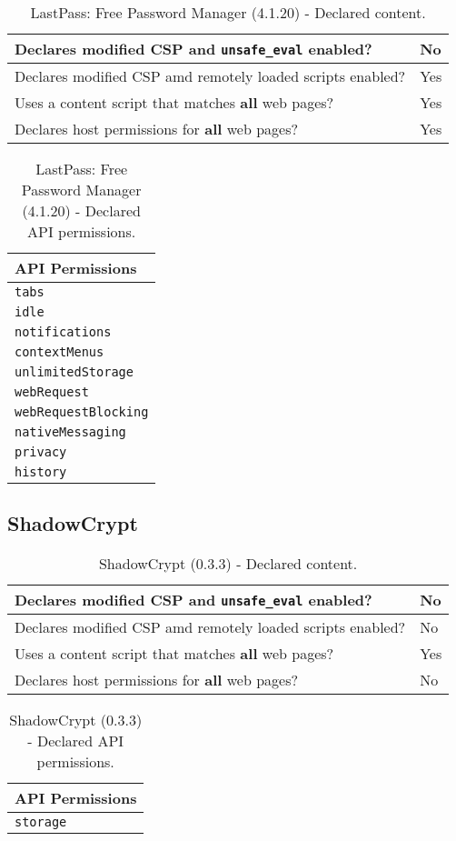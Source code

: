 \begin{table}[h]
	\centering
	\begin{tabular}{|l|l|} \hline
		Declares modified CSP and \texttt{unsafe\_eval} enabled? & No \\ \hline
		Declares modified CSP amd remotely loaded scripts enabled? & Yes \\ \hline
		Uses a content script that matches \textbf{all} web pages? & Yes \\ \hline
		Declares host permissions for \textbf{all} web pages? & Yes \\ \hline
	\end{tabular}
	\caption{LastPass: Free Password Manager (4.1.20) - Declared content.}
\end{table}
\begin{table}[h]
	\centering
	\begin{tabular}{|l|} \hline
		\textbf{API Permissions} \\ \hline
		\texttt{tabs} \\
		\texttt{idle} \\
		\texttt{notifications} \\
		\texttt{contextMenus} \\
		\texttt{unlimitedStorage} \\
		\texttt{webRequest} \\
		\texttt{webRequestBlocking} \\
		\texttt{nativeMessaging} \\
		\texttt{privacy} \\
		\texttt{history} \\
		\hline
	\end{tabular}
	\caption{LastPass: Free Password Manager (4.1.20) - Declared API permissions.}
\end{table}
\newpage
\subsection{ShadowCrypt}

\begin{table}[h]
	\centering
	\begin{tabular}{|l|l|} \hline
		Declares modified CSP and \texttt{unsafe\_eval} enabled? & No \\ \hline
		Declares modified CSP amd remotely loaded scripts enabled? & No \\ \hline
		Uses a content script that matches \textbf{all} web pages? & Yes \\ \hline
		Declares host permissions for \textbf{all} web pages? & No \\ \hline
	\end{tabular}
	\caption{ShadowCrypt (0.3.3) - Declared content.}
\end{table}
\begin{table}[h]
	\centering
	\begin{tabular}{|l|} \hline
		\textbf{API Permissions} \\ \hline
		\texttt{storage} \\
		\hline
	\end{tabular}
	\caption{ShadowCrypt (0.3.3) - Declared API permissions.}
\end{table}
\newpage
